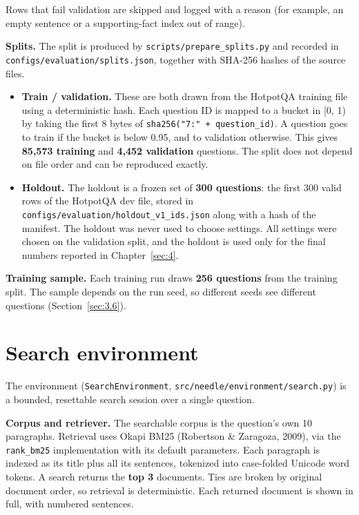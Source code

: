 Rows that fail validation are skipped and logged with a reason (for
example, an empty sentence or a supporting-fact index out of range).

\textbf{Splits.} The split is produced by
\texttt{scripts/\allowbreak{}prepare\_\allowbreak{}splits.\allowbreak{}py}
and recorded in
\texttt{configs/\allowbreak{}evaluation/\allowbreak{}splits.\allowbreak{}json},
together with SHA-256 hashes of the source files.

\begin{itemize}
\tightlist
\item
  \textbf{Train / validation.} These are both drawn from the HotpotQA
  training file using a deterministic hash. Each question ID is mapped
  to a bucket in {[}0, 1) by taking the first 8 bytes of
  \texttt{sha256("7:" + question\_\allowbreak{}id)}. A question goes to
  train if the bucket is below 0.95, and to validation otherwise. This
  gives \textbf{85,573 training} and \textbf{4,452 validation}
  questions. The split does not depend on file order and can be
  reproduced exactly.
\item
  \textbf{Holdout.} The holdout is a frozen set of \textbf{300
  questions}: the first 300 valid rows of the HotpotQA dev file, stored
  in
  \texttt{configs/\allowbreak{}evaluation/\allowbreak{}holdout\_\allowbreak{}v1\_\allowbreak{}ids.\allowbreak{}json}
  along with a hash of the manifest. The holdout was never used to
  choose settings. All settings were chosen on the validation split, and
  the holdout is used only for the final numbers reported in
  Chapter~\ref{sec:4}.
\end{itemize}

\textbf{Training sample.} Each training run draws \textbf{256 questions}
from the training split. The sample depends on the run seed, so
different seeds see different questions (Section~\ref{sec:3.6}).

\section{Search environment}\label{sec:3.3}

The environment (\texttt{SearchEnvironment},
\texttt{src/\allowbreak{}needle/\allowbreak{}environment/\allowbreak{}search.\allowbreak{}py})
is a bounded, resettable search session over a single question.

\textbf{Corpus and retriever.} The searchable corpus is the question's
own 10 paragraphs. Retrieval uses Okapi BM25 (Robertson \& Zaragoza,
2009), via the \texttt{rank\_\allowbreak{}bm25} implementation with its
default parameters. Each paragraph is indexed as its title plus all its
sentences, tokenized into case-folded Unicode word tokens. A search
returns the \textbf{top 3} documents. Ties are broken by original
document order, so retrieval is deterministic. Each returned document is
shown in full, with numbered sentences.

